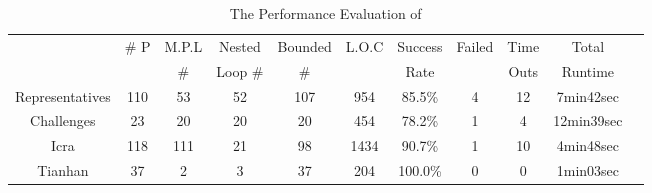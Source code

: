 \begin{table}[H]
 \vspace{-1cm}
\caption{The Performance Evaluation of {\THESYSTEM}}
\label{tb:performance-eval}
    \centering
{\scriptsize
\begin{tabular}{ | >{\small}c | c | c | c | c | c | c | c | c | c | c |}
\hline
\multirow{2}{*}{Benchmarks} & \multirow{2}{*}{\# P}  & {M.P.L} & Nested  & {Bounded} & L.O.C & {Success} & \multirow{2}{*}{Failed} & Time  & Total
\\
&  & \# & Loop \# & \# & & Rate &  & Outs &   Runtime \\
\hline {Representatives} & {110}  & 53  & 52  & 107 & 954 & 85.5\% & 4 & 12 & 7min42sec \\
\hline
Challenges & 23  & 20 & 20 & {20} & 454 & {78.2\%}  & 1 & 4 & {12min39sec} \\
\hline
{Icra} & 118 & 111 & 21 & 98 & 1434  & 90.7\% & 1 & 10 & {4min48sec} \\
\hline
Tianhan & 37 & 2 & 3 & 37 & 204 & 100.0\% & 0 & 0 & 1min03sec \\
\hline
\end{tabular}    
}
 \vspace{-0.8cm}
\end{table}